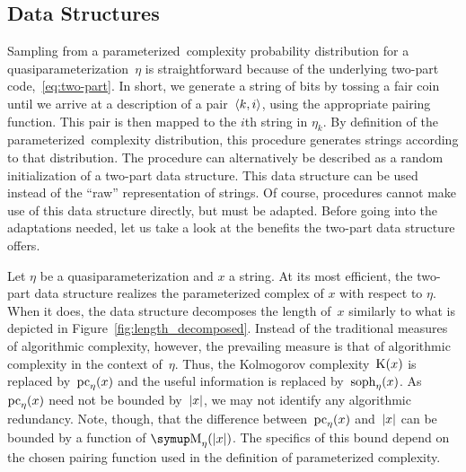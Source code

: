 \subsection{Data Structures}
Sampling from a parameterized~complexity probability distribution for a quasiparameterization~$\eta$ is straightforward because of the underlying two-part code,~\eqref{eq:two-part}.
In short, we generate a string of bits by tossing a fair coin until we arrive at a description of a pair~${\langle k, i\rangle}$, using the appropriate pairing function.
This pair is then mapped to the $i$th string in $\eta_k$.
By definition of the parameterized~complexity distribution, this procedure generates strings according to that distribution.
The procedure can alternatively be described as a random initialization of a two-part data structure.
This data structure can be used instead of the \enquote{raw} representation of strings.
Of course, procedures cannot make use of this data structure directly, but must be adapted.
Before going into the adaptations needed, let us take a look at the benefits the two-part data structure offers.

Let $\eta$ be a quasiparameterization and $x$ a string.
At its most efficient, the two-part data structure realizes the parameterized complex of $x$ with respect to $\eta$.
When it does, the data structure decomposes the length of~$x$ similarly to what is depicted in Figure~\ref{fig:length_decomposed}.
Instead of the traditional measures of algorithmic complexity, however, the prevailing measure is that of algorithmic complexity in the context of~$\eta$.
Thus, the Kolmogorov complexity~$\operatorname{K}(x)$ is replaced by~$\operatorname{pc}_\eta(x)$ and the useful information is replaced by~$\operatorname{soph}_\eta(x)$.
As~$\operatorname{pc}_\eta(x)$ need not be bounded by~${\lvert x\rvert}$, we may not identify any algorithmic redundancy.
Note, though, that the difference between~$\operatorname{pc}_\eta(x)$ and~${\lvert x\rvert}$ can be bounded by a function of $\upM_\eta(\length{x})$.
The specifics of this bound depend on the chosen pairing function used in the definition of parameterized complexity.

